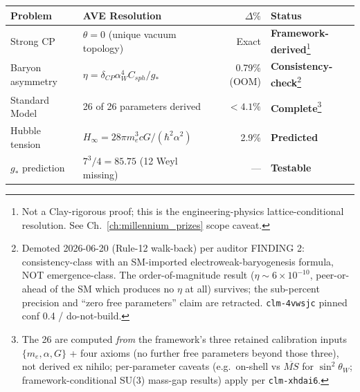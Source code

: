 \begin{center}
\small
\begin{tabular}{llrl}
\toprule
\textbf{Problem} & \textbf{AVE Resolution} & \textbf{$\Delta\%$} & \textbf{Status} \\
\midrule
Strong CP   & $\theta = 0$ (unique vacuum topology) & Exact & \textbf{Framework-derived}\footnote{Not a Clay-rigorous proof; this is the engineering-physics lattice-conditional resolution. See Ch.~\ref{ch:millennium_prizes} scope caveat.} \\
Baryon asymmetry & $\eta = \delta_{CP} \alpha_W^4 C_{sph}/g_*$ & 0.79\% (OOM) & \textbf{Consistency-check}\footnote{Demoted 2026-06-20 (Rule-12 walk-back) per auditor FINDING 2: consistency-class with an SM-imported electroweak-baryogenesis formula, NOT emergence-class. The order-of-magnitude result ($\eta \sim 6\times10^{-10}$, peer-or-ahead of the SM which produces no $\eta$ at all) survives; the sub-percent precision and ``zero free parameters'' claim are retracted. \texttt{clm-4vwsjc} pinned conf 0.4 / do-not-build.} \\
Standard Model & 26 of 26 parameters derived & $< 4.1\%$ & \textbf{Complete}\footnote{The 26 are computed \emph{from} the framework's three retained calibration inputs $\{m_e,\alpha,G\}$ + four axioms (no further free parameters beyond those three), not derived ex nihilo; per-parameter caveats (e.g.\ on-shell vs $\overline{MS}$ for $\sin^2\theta_W$; framework-conditional SU(3) mass-gap results) apply per \texttt{clm-xhdai6}.} \\
Hubble tension & $H_\infty = 28\pi m_e^3 cG/(\hbar^2\alpha^2)$ & 2.9\% & \textbf{Predicted} \\
$g_*$ prediction & $7^3/4 = 85.75$ (12 Weyl missing) & --- & \textbf{Testable} \\
\bottomrule
\end{tabular}
\end{center}

